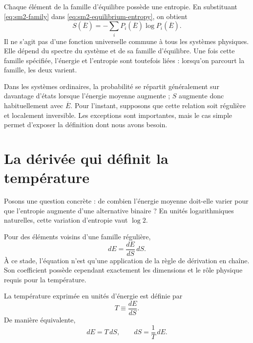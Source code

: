 Chaque élément de la famille d’équilibre possède une entropie. En substituant \eqref{eq:sm2-family} dans \eqref{eq:sm2-equilibrium-entropy}, on obtient
\begin{equation}
 S(\overline E)
 =-\sum_iP_i(\overline E)\log P_i(\overline E).
 \label{eq:sm2-entropy-energy}
\end{equation}
Il ne s’agit pas d’une fonction universelle commune à tous les systèmes physiques. Elle dépend du spectre du système et de sa famille d’équilibre. Une fois cette famille spécifiée, l’énergie et l’entropie sont toutefois liées : lorsqu’on parcourt la famille, les deux varient.

Dans les systèmes ordinaires, la probabilité se répartit généralement sur davantage d’états lorsque l’énergie moyenne augmente ; \(S\) augmente donc habituellement avec \(\overline E\). Pour l’instant, supposons que cette relation soit régulière et localement inversible. Les exceptions sont importantes, mais le cas simple permet d’exposer la définition dont nous avons besoin.

\section{La dérivée qui définit la température}

Posons une question concrète : de combien l’énergie moyenne doit-elle varier pour que l’entropie augmente d’une alternative binaire ? En unités logarithmiques naturelles, cette variation d’entropie vaut \(\log2\).

Pour des éléments voisins d’une famille régulière,
\begin{equation}
 dE=\frac{dE}{dS}\,dS.
 \label{eq:sm2-differential-identity}
\end{equation}
À ce stade, l’équation n’est qu’une application de la règle de dérivation en chaîne. Son coefficient possède cependant exactement les dimensions et le rôle physique requis pour la température.

\begin{definition}La température exprimée en unités d’énergie est définie par
\begin{equation}
 T\equiv\frac{dE}{dS}.
 \label{eq:sm2-temperature-definition}
\end{equation}
De manière équivalente,
\begin{equation}
 dE=T\,dS,
 \qquad
 dS=\frac{1}{T}\,dE.
 \label{eq:sm2-fundamental-differentials}
\end{equation}
\end{definition}


